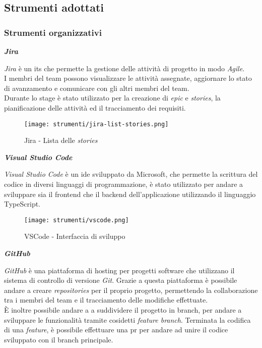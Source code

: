 \pagebreak
\subsection{Strumenti adottati}
\label{sez:strumenti-adottati}

\subsubsection{Strumenti organizzativi}
\label{sez:strumenti-organizzativi}

\noindent \textbf{\textit{Jira\\}} 

\noindent \textit{Jira} è un \gls{its} che permette la gestione delle attività di progetto in modo \textit{Agile}.\\
I membri del team possono visualizzare le attività assegnate, aggiornare lo stato di avanzamento e comunicare con gli altri membri del team. \\
Durante lo stage è stato utilizzato per la creazione di \textit{epic} e \textit{stories}, la pianificazione delle attività ed il tracciamento dei requisiti.

\begin{figure}[H]
    \label{fig:jira-list-stories}
    \centering
    \texttt{[image: strumenti/jira-list-stories.png]}
    \caption{Jira - Lista delle \textit{stories}}
\end{figure}



\noindent \textbf{\textit{Visual Studio Code\\}}

\noindent \textit{Visual Studio Code} è un \gls{ide} sviluppato da Microsoft, che permette la scrittura del codice in diversi linguaggi di programmazione, è stato utilizzato per andare
a sviluppare sia il \gls{frontend} che il \gls{backend} dell'applicazione utilizzando il linguaggio TypeScript.\\

\begin{figure}[H]
    \label{fig:vscode}
    \centering
    \texttt{[image: strumenti/vscode.png]}
    \caption{VSCode - Interfaccia di sviluppo}
\end{figure}

\pagebreak  
\noindent \textbf{\textit{GitHub\\}}

\noindent \textit{GitHub} è una piattaforma di hosting per progetti software che utilizzano il sistema di controllo di versione \textit{Git}.
Grazie a questa piattaforma è possibile andare a creare \textit{repositories} per il proprio progetto, permettendo la collaborazione tra i membri del team e il tracciamento delle modifiche effettuate. \\
È inoltre possibile andare a a suddividere il progetto in \gls{branch}, per andare a sviluppare le funzionalità tramite cosidetti \textit{feature branch}.
Terminata la codifica di una \textit{feature}, è possibile effettuare una \gls{pr} per andare ad unire il codice sviluppato con il \gls{branch} principale.

